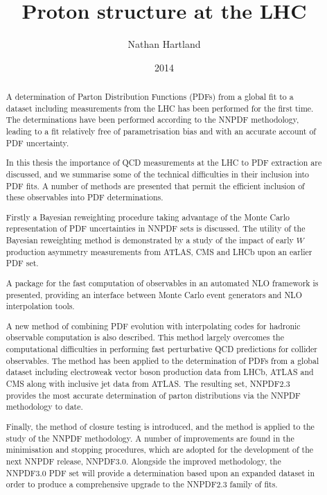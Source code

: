 \documentclass[12pt,twoside,openright]{report}
\title{Proton structure at the LHC}
\author{Nathan Hartland}
\date{2014}
\begin{document}
\maketitle
\setcounter{page}{1}
\dedication{To my parents}
\declaration

\acknowledgements

\begin{spacing}{1.5}

\begin{abstract}
A determination of Parton Distribution Functions (PDFs) from a global fit to a dataset including measurements from the LHC has been performed for the first time. The determinations
have been performed according to the NNPDF methodology, leading to a fit relatively free of parametrisation bias and with an accurate account of PDF uncertainty.

In this thesis the importance of QCD measurements at the LHC to PDF extraction are discussed, and we summarise some of the technical difficulties in their inclusion into PDF fits. A number of methods are presented that permit the efficient inclusion of these observables
into PDF determinations.

Firstly a Bayesian reweighting procedure taking advantage of the Monte Carlo representation of PDF uncertainties in NNPDF sets is discussed. The utility of the Bayesian reweighting method is demonstrated by a study of the impact of early $W$ production asymmetry measurements from ATLAS, CMS and LHCb upon an earlier PDF set.

A package for the fast computation of observables in an automated NLO framework is presented, providing an interface between Monte Carlo event generators and NLO interpolation tools.

A new method of combining PDF evolution with interpolating codes for hadronic observable computation is also described. This method largely overcomes the computational difficulties in performing fast perturbative QCD predictions for collider observables. The method has been applied to the determination of PDFs from a global dataset including electroweak vector boson production data from LHCb, ATLAS and CMS along with inclusive jet data from ATLAS. The resulting set, NNPDF2.3 provides the most accurate determination of parton distributions via the NNPDF methodology to date.

Finally, the method of closure testing is introduced, and the method is applied to the study of the NNPDF methodology. A number of improvements are found in the minimisation and stopping procedures, which are adopted for the development of the next NNPDF release, NNPDF3.0. Alongside the improved methodology, the NNPDF3.0 PDF set will provide a determination based upon an expanded dataset in order to produce a comprehensive upgrade to the NNPDF2.3 family of fits.
\vspace{10mm}
\normalsize



\end{abstract}
\end{spacing}
\end{document}
